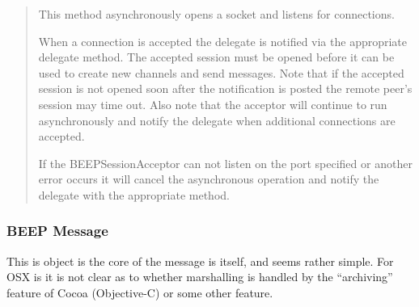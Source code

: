 \documentclass[11pt]{article}
\begin{document}
\begin {quote}
This method asynchronously opens a socket and listens for connections.

 When a connection is accepted the delegate is notified via the appropriate delegate method.  The accepted session must be opened before it can be used to create new channels and send messages.  Note that if the accepted session is not opened soon after the notification is posted the remote peer's session may time out. Also note that the acceptor will continue to run asynchronously and notify the delegate when additional connections are accepted.
 
 If the BEEPSessionAcceptor can not listen on the port specified or another error occurs it will cancel
 the asynchronous operation and notify the delegate with the appropriate method.
\end{quote}\cite {OSXgridAPI}


    
    
\subsubsection {BEEP Message}
 This is object is the core of the message is itself, and seems rather simple.  For OSX is it is not clear as to whether marshalling is handled by the ``archiving'' feature of Cocoa (Objective-C) or some other feature.  
 
\end{document}

